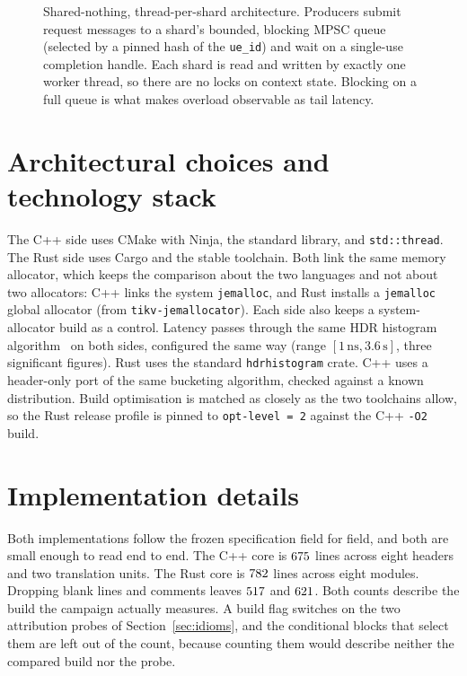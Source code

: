 \documentclass[english,oneside,a4paper,censored,csm,software-track-2020]{HYthesisML}
\begin{document}
\begin{figure}[ht]
\caption[Shared-nothing, thread-per-shard architecture]{Shared-nothing, thread-per-shard architecture. Producers submit request messages to a
shard's bounded, blocking MPSC queue (selected by a pinned hash of the \texttt{ue\_id}) and wait
on a single-use completion handle. Each shard is read and written by exactly one worker thread,
so there are no locks on context state. Blocking on a full queue is what makes overload
observable as tail latency.\label{fig:arch}}
\end{figure}

\section{Architectural choices and technology stack}
The C++ side uses CMake with Ninja, the standard library, and \texttt{std::thread}. The Rust
side uses Cargo and the stable toolchain. Both link the same memory allocator, which keeps the
comparison about the two languages and not about two allocators: C++ links the system
\texttt{jemalloc}, and Rust installs a \texttt{jemalloc} global allocator (from
\texttt{tikv-jemallocator}). Each side also keeps a system-allocator build as a control.
Latency passes through the same HDR histogram
algorithm~\cite{tene_hdrhistogram} on both sides, configured the same way (range
$[1\,\text{ns}, 3.6\,\text{s}]$, three significant figures). Rust uses the standard
\texttt{hdrhistogram} crate. C++ uses a header-only port of the same bucketing algorithm,
checked against a known distribution. Build optimisation is matched as closely as the two
toolchains allow, so the Rust release profile is pinned to \texttt{opt-level~=~2} against the
C++ \texttt{-O2} build.

\section{Implementation details}\label{sec:impldetails}
\label{sec:impl}
Both implementations follow the frozen specification field for field, and both are small
enough to read end to end. The C++ core is $675$ lines across eight headers and two
translation units. The Rust core is $782$ lines across eight modules. Dropping blank
lines and comments leaves $517$ and $621$. Both counts describe the build the
campaign actually measures. A build flag switches on the two attribution probes of
Section~\ref{sec:idioms}, and the conditional blocks that select them are left out of the count,
because counting them would describe neither the compared build nor the probe.
\end{document}
